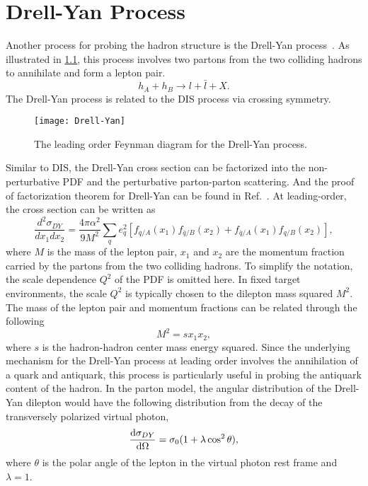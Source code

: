 \documentclass[../main.tex]{subfiles}
\begin{document}
\chapter{Drell-Yan Process}
\label{ch:DY}
Another process for probing the hadron structure is the Drell-Yan process~\cite{drell1970}.
As illustrated in \cref{fig:DY}, this process involves two partons from the
two colliding hadrons to annihilate and form a lepton pair.
\begin{equation}
	h_A + h_B \rightarrow l + \bar{l} + X.
\end{equation}
The Drell-Yan process is related to the DIS process via crossing symmetry.
\begin{figure}[htbp!]
	\centering
	\texttt{[image: Drell-Yan]}
	\caption{The leading order Feynman diagram for the Drell-Yan process.}
	\label{fig:DY}
\end{figure}
Similar to DIS, the Drell-Yan cross section can be factorized into the non-perturbative
PDF and the perturbative parton-parton scattering. And the proof of factorization
theorem for Drell-Yan can be found in Ref.~\cite{collins1989}. At leading-order,
the cross section can be written as
\begin{equation}
	\frac{d^2\sigma_{DY}}{dx_{1}dx_{2}} = \frac{4\pi\alpha^2}{9M^2}\sum_q e^2_q
	\left[f_{q/A}\left(x_1\right)f_{\bar{q}/B}\left(x_2\right) +
	f_{\bar{q}/A}\left(x_1\right)f_{q/B}\left(x_2\right)
	\right],
	\label{eq:DY_cs}
\end{equation}
where $M$ is the mass of the lepton pair, $x_1$ and $x_2$ are the momentum fraction
carried by the partons from the two colliding hadrons. To simplify the notation,
the scale dependence $Q^2$ of the PDF is omitted here. In fixed target environments,
the scale $Q^2$ is typically chosen to the dilepton mass squared $M^2$.
The mass of the lepton pair and momentum fractions can be related through the following
\begin{equation}
	M^2= sx_1x_2,
	\label{eq:mass}
\end{equation}
where $s$ is the hadron-hadron center mass energy squared.
Since the underlying mechanism for the Drell-Yan process at leading order involves the annihilation
of a quark and antiquark, this process is particularly useful in probing the antiquark
content of the hadron.
In the parton model, the angular distribution of the Drell-Yan dilepton would have the following
distribution from the decay of the transversely polarized virtual photon,
\begin{equation}
	\dv{\sigma_{DY}}{\Omega} = \sigma_0(1+\lambda \cos^2\theta),
\end{equation}
where $\theta$ is the polar angle of the lepton in the virtual photon rest frame and $\lambda=1$.
\end{document}
